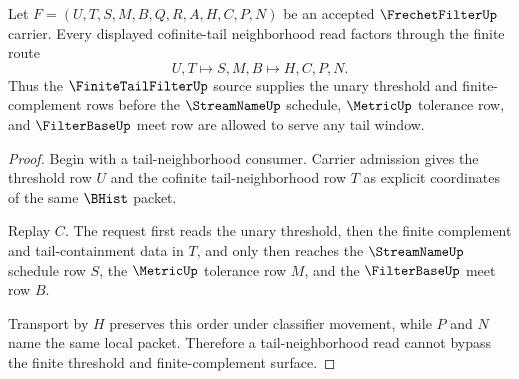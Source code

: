 \begin{theorem}
\label{thm:frechet-filter-tail-neighborhood-handoff}
Let $F=(U,T,S,M,B,Q,R,A,H,C,P,N)$ be an accepted $\FrechetFilterUp$ carrier. Every displayed cofinite-tail neighborhood read factors through the finite route
$$
U,T \longmapsto S,M,B \longmapsto H,C,P,N .
$$
Thus the $\FiniteTailFilterUp$ source supplies the unary threshold and finite-complement rows before the $\StreamNameUp$ schedule, $\MetricUp$ tolerance row, and $\FilterBaseUp$ meet row are allowed to serve any tail window.
\end{theorem}
\begin{proof}
Begin with a tail-neighborhood consumer. Carrier admission gives the threshold row $U$ and the cofinite tail-neighborhood row $T$ as explicit coordinates of the same $\BHist$ packet.

Replay $C$. The request first reads the unary threshold, then the finite complement and tail-containment data in $T$, and only then reaches the $\StreamNameUp$ schedule row $S$, the $\MetricUp$ tolerance row $M$, and the $\FilterBaseUp$ meet row $B$.

Transport by $H$ preserves this order under classifier movement, while $P$ and $N$ name the same local packet. Therefore a tail-neighborhood read cannot bypass the finite threshold and finite-complement surface.
\end{proof}

